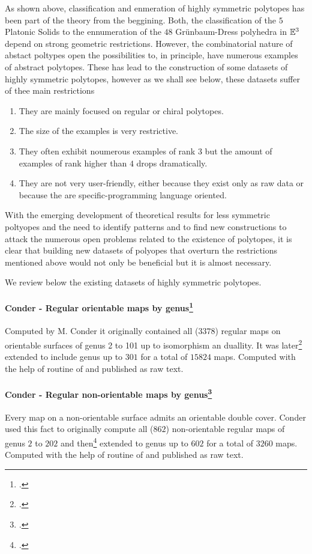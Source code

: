 
As shown above, classification and enmeration of highly symmetric polytopes has been part of the theory from the beggining.
Both, the classification of the $5$ Platonic Solids to the ennumeration of the $48$ Grünbaum-Dress polyhedra in $\mathbb{E}^{3}$ depend on strong geometric restrictions.
However, the combinatorial nature of abstact poltypes open the possibilities to, in principle, have numerous examples of abstract polytopes.
These has lead to the construction of some datasets of highly symmetric polytopes, however as we shall see below, these datasets suffer of thee main restrictions
\begin{enumerate}[label=\textit{(\roman*)}, noitemsep]
  \item They are mainly focused on regular or chiral polytopes.
  \item The size of the examples is very restrictive.
  \item They often exhibit noumerous examples of rank $3$ but the amount of examples of rank higher than $4$ drops dramatically.
  \item They are not very user-friendly, either because they exist only as raw data or because the are specific-programming language oriented.
\end{enumerate}

With the emerging development of theoretical results for less symmetric poltyopes and the need to identify patterns and to find new constructions to attack the numerous open problems related to the existence of polytopes, it is clear that building new datasets of polyopes that overturn the restrictions mentioned above would not only be beneficial but it is almost necessary.

We review below the existing datasets of highly symmetric polytopes.

\paragraph{Conder - Regular orientable maps by genus\footcite{Conder_2006_RegularOrientableMaps} } Computed by M. Conder it originally contained all ($3378$) regular maps on orientable surfaces of genus 2 to 101 up to isomorphism an duallity. It was later\footcite{Conder_2011_RegularOrientableMaps} extended to include genus up to $301$ for a total of $15824$ maps.
Computed with the help of \lins routine of \magma and published as raw text.

\paragraph{Conder - Regular non-orientable maps by genus\footcite{Conder_2006_RegularNonOrientable} } Every map on a non-orientable surface admits an orientable double cover. Conder used this fact to originally compute all ($862$) non-orientable regular maps of genus $2$ to $202$ and then\footcite{Conder_2012_RegularNonOrientable} extended to genus up to $602$ for a total of $3260$ maps.
Computed with the help of \lins routine of \magma and published as raw text.

